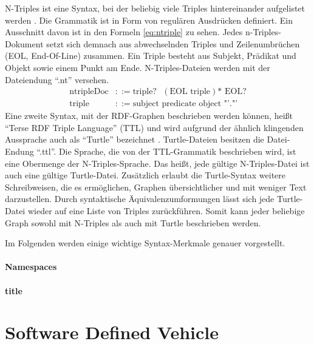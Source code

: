 N-Triples ist eine Syntax, bei der beliebig viele Triples hintereinander aufgelistet werden \cite[vgl.][]{w3c2014ntriples}. Die Grammatik ist in Form von regulären Ausdrücken definiert. Ein Ausschnitt davon ist in den Formeln \ref{eq:ntriple} zu sehen. Jedes n-Triples-Dokument setzt sich demnach aus abwechselnden Triples und Zeilenumbrüchen (EOL, End-Of-Line) zusammen. Ein Triple besteht aus Subjekt, Prädikat und Objekt sowie einem Punkt am Ende. N-Triples-Dateien werden mit der Dateiendung "`.nt"' versehen.
\begin{align}
	\text{ntripleDoc} & ::= \text{triple?}\text{ } (\text{EOL triple})\mbox{*} \text{ EOL?} \label{eq:ntriple}\\
	\text{triple} & ::= \text{subject } \text{predicate } \text{object } \text{"'."'} \nonumber
\end{align}
Eine zweite Syntax, mit der RDF-Graphen beschrieben werden können, heißt "`Terse RDF Triple Language"' (TTL) und wird aufgrund der ähnlich klingenden Aussprache auch als "`Turtle"' bezeichnet  \cite[vgl.][]{w3c2014turtle}. Turtle-Dateien besitzen die Datei-Endung "`.ttl"'.
Die Sprache, die von der TTL-Grammatik beschrieben wird, ist eine Obermenge der N-Triples-Sprache. Das heißt, jede gültige N-Triples-Datei ist auch eine gültige Turtle-Datei. Zusätzlich erlaubt die Turtle-Syntax weitere Schreibweisen, die es ermöglichen, Graphen übersichtlicher und mit weniger Text darzustellen. Durch syntaktische Äquivalenzumformungen lässt sich jede Turtle-Datei wieder auf eine Liste von Triples zurückführen. Somit kann jeder beliebige Graph sowohl mit N-Triples als auch mit Turtle beschrieben werden.

Im Folgenden werden einige wichtige Syntax-Merkmale genauer vorgestellt.
\paragraph{Namespaces}
\paragraph{title}


\section{Software Defined Vehicle}

